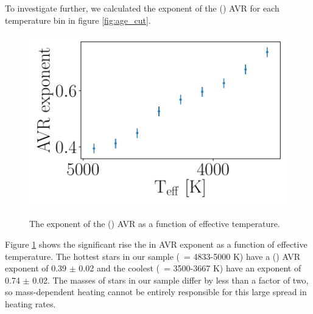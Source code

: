 To investigate further, we calculated the exponent of the (\vb) AVR for each
temperature bin in figure \ref{fig:age_cut}.
\begin{figure}
  \caption{
      The exponent of the (\vb) AVR as a function of effective temperature.
}
  \centering
    \includegraphics[width=1\textwidth]{AVR_exponent}
\label{fig:AVR_exponent}
\end{figure}
Figure \ref{fig:AVR_exponent} shows the significant rise the in AVR exponent
as a function of effective temperature.
The hottest stars in our sample (\teff\ = 4833-5000 K) have a (\vb) AVR
exponent of 0.39 $\pm$ 0.02 and the coolest (\teff\ = 3500-3667 K) have an
exponent of 0.74 $\pm$ 0.02.
The masses of stars in our sample differ by less than a factor of two,
so mass-dependent heating cannot be entirely responsible for this large spread
in heating rates.

